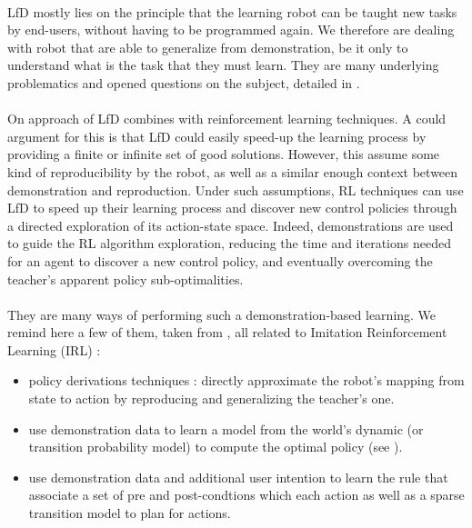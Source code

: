 \documentclass[a4paper]{report}
\begin{document}
{{{				\paragraph{} LfD mostly lies on the principle that the learning robot can be taught new tasks by end-users, without having to be programmed again. We therefore are dealing with robot that are able to generalize from demonstration, be it only to understand what is the task that they must learn. They are many underlying problematics and opened questions on the subject, detailed in \cite{Billard2016}.
				
				\paragraph{} On approach of LfD combines with reinforcement learning techniques. A could argument for this is that LfD could easily speed-up the learning process by providing a finite or infinite set of good solutions. However, this assume some kind of reproducibility by the robot, as well as a similar enough context between demonstration and reproduction. \newline
				Under such assumptions, RL techniques can use LfD to speed up their learning process and discover new control policies through a directed exploration of its action-state space. Indeed, demonstrations are used to guide the RL algorithm exploration, reducing the time and iterations needed for an agent to discover a new control policy, and eventually overcoming the teacher's apparent policy sub-optimalities. 
				
				\paragraph{} They are many ways of performing such a demonstration-based learning. We remind here a few of them, taken from \cite{argall2009survey}, all related to Imitation Reinforcement Learning (IRL) : 
				\begin{itemize}
					\item policy derivations techniques : directly approximate the robot's mapping from state to action by reproducing and generalizing the teacher's one. 
					\item use demonstration data to learn a model from the world's dynamic (or transition probability model) to compute the optimal policy (see \cite{price2003accelerating}). 
					\item use demonstration data and additional user intention to learn the rule that associate a set of pre and post-condtions which each action as well as a sparse transition model to plan for actions. 
				\end{itemize}
				
}}}
\end{document}
